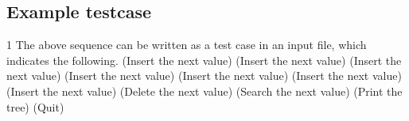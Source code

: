 \documentclass{article}
\begin{document}
\subsection{Example testcase}
1\newline\newline
The above sequence can be written as a test case in an input file, which indicates the following. (Insert the next value) (Insert the next value) (Insert the next value) (Insert the next value) (Insert the next value) (Insert the next value) (Insert the next value) (Delete the next value) (Search the next value) (Print the tree) (Quit)
\end{document}
